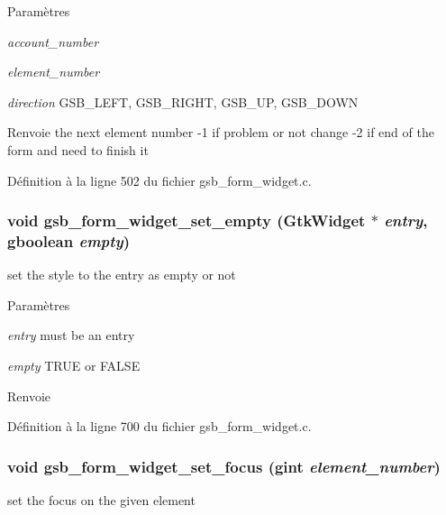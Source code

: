 \begin{DoxyParams}{Paramètres}
\item[{\em account\_\-number}]\item[{\em element\_\-number}]\item[{\em direction}]GSB\_\-LEFT, GSB\_\-RIGHT, GSB\_\-UP, GSB\_\-DOWN\end{DoxyParams}
\begin{DoxyReturn}{Renvoie}
the next element number -\/1 if problem or not change -\/2 if end of the form and need to finish it 
\end{DoxyReturn}


Définition à la ligne 502 du fichier gsb\_\-form\_\-widget.c.

\subsubsection[{gsb\_\-form\_\-widget\_\-set\_\-empty}]{\setlength{\rightskip}{0pt plus 5cm}void gsb\_\-form\_\-widget\_\-set\_\-empty (GtkWidget $\ast$ {\em entry}, \/  gboolean {\em empty})}\label{gsb__form__widget_8c_a0b68e260dc6da6f49888145c901faaa9}
set the style to the entry as empty or not


\begin{DoxyParams}{Paramètres}
\item[{\em entry}]must be an entry \item[{\em empty}]TRUE or FALSE\end{DoxyParams}
\begin{DoxyReturn}{Renvoie}

\end{DoxyReturn}


Définition à la ligne 700 du fichier gsb\_\-form\_\-widget.c.

\subsubsection[{gsb\_\-form\_\-widget\_\-set\_\-focus}]{\setlength{\rightskip}{0pt plus 5cm}void gsb\_\-form\_\-widget\_\-set\_\-focus (gint {\em element\_\-number})}\label{gsb__form__widget_8c_a44684cf3788bb37368da547e0a7c7296}
set the focus on the given element


